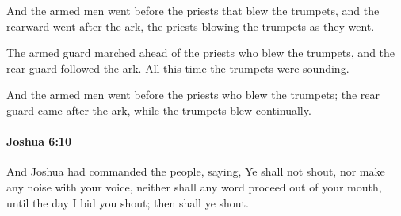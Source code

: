 			\begin{versebox}
					\item[BHS] 
					\item[ASV] And the armed men went before the priests that blew the trumpets, and the rearward went after the ark, the priests blowing the trumpets as they went.
					\item[NIV] The armed guard marched ahead of the priests who blew the trumpets, and the rear guard followed the ark. All this time the trumpets were sounding.
					\item[NRSV] And the armed men went before the priests who blew the trumpets; the rear guard came after the ark, while the trumpets blew continually.
			\end{versebox}

		\paragraph{Joshua 6:10} %
			\label{JOSHUA-6-10}

			And Joshua had commanded the people, saying, Ye shall not shout, nor make any noise with your voice, neither shall any word proceed out of your mouth, until the day I bid you shout; then shall ye shout.

